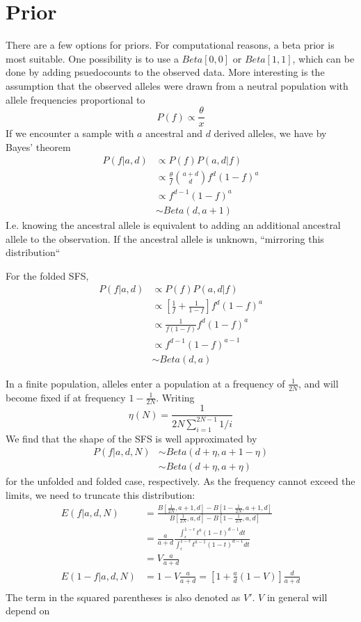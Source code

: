 \documentclass[10pt,a4paper]{article}
\begin{document}
\section{Prior}
There are a few options for priors. For computational reasons, a beta prior is most suitable.
One possibility is to use a $Beta[0,0]$ or $Beta[1,1]$, which can be done by adding psuedocounts to the observed data.
More interesting is the assumption that the observed alleles were drawn from a neutral population with allele frequencies proportional to 
\begin{equation}
P(f) \propto \frac{\theta}{x}
\end{equation}
If we encounter a sample with $a$ ancestral and $d$ derived alleles, we have by Bayes' theorem
\begin{align}
P(f | a, d) &\propto P(f) P(a, d|f) \nonumber\\
&\propto \frac{\theta}{f} \binom{a+d}{d} f^d (1-f)^a \nonumber\\
&\propto f^{d-1} (1-f)^a \nonumber\\
&\sim Beta(d, a+1)
\end{align}
I.e. knowing the ancestral allele is equivalent to adding an additional ancestral allele to the observation. If the ancestral allele is unknown, ``mirroring this distribution``

For the folded SFS,
\begin{align}
P(f | a, d) &\propto P(f) P(a, d|f) \nonumber\\
&\propto \left[ \frac{1}{f} + \frac{1}{1-f}\right] f^d (1-f)^a\nonumber\\
&\propto \frac{1}{f(1-f)} f^d (1-f)^a\nonumber\\
&\propto f^{d-1} (1-f)^{a-1} \nonumber\\
&\sim Beta(d, a)
\end{align}

In a finite population, alleles enter a population at a frequency of $\frac{1}{2N}$, and will become fixed if at frequency $1-\frac{1}{2N}$. Writing
$$\eta(N) = \frac{1}{2N \sum_{i=1}^{2N-1}1/i}$$
We find that the shape of the SFS is well approximated by 
\begin{align}
P(f | a, d, N) &\sim Beta(d + \eta, a+1 - \eta)\\
&\sim Beta(d + \eta, a + \eta)
\end{align}
for the unfolded and folded case, respectively. As the frequency cannot exceed the limits, we need to truncate this distribution:
\begin{align}
E(f | a, d, N) &= \frac{B[\frac{1}{2N}, a+1, d]-B[1-\frac{1}{2N}, a+1, d]}{B[\frac{1}{2N}, a, d]-B[1-\frac{1}{2N}, a, d]}\nonumber\\
&= \frac{a}{a+d} \frac{\int_\epsilon^{1-\epsilon} t^a(1-t)^{d-1}dt}
{\int_\epsilon^{1-\epsilon} t^{a-1}(1-t)^{d-1}dt}\nonumber\\
&= V \frac{a}{a+d}\\
E(1-f | a, d, N)&= 1-V\frac{a}{a+d} = \left[1 + \frac{a}{d} (1-V)\right] \frac{d}{a+d}\\
\end{align}
The term in the squared parentheses is also denoted as $V'$. $V$ in general will depend on 
\end{document}
